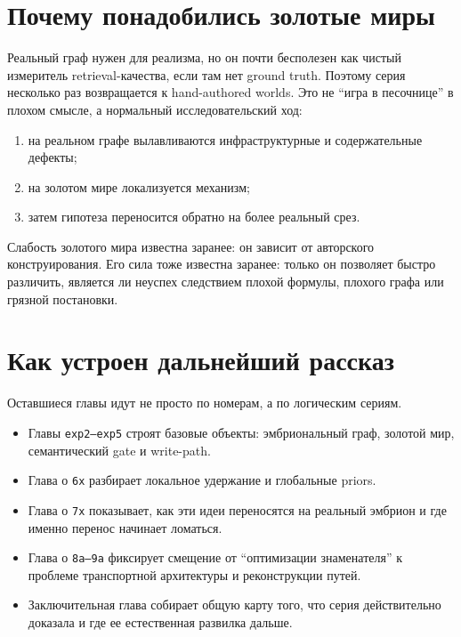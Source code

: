 \section{Почему понадобились золотые миры}

Реальный граф нужен для реализма, но он почти бесполезен как чистый измеритель
retrieval-качества, если там нет ground truth. Поэтому серия несколько раз
возвращается к hand-authored worlds. Это не ``игра в песочнице'' в плохом
смысле, а нормальный исследовательский ход:

\begin{enumerate}[leftmargin=2em]
\item на реальном графе вылавливаются инфраструктурные и содержательные дефекты;
\item на золотом мире локализуется механизм;
\item затем гипотеза переносится обратно на более реальный срез.
\end{enumerate}

Слабость золотого мира известна заранее: он зависит от авторского конструирования.
Его сила тоже известна заранее: только он позволяет быстро различить, является
ли неуспех следствием плохой формулы, плохого графа или грязной постановки.

\section{Как устроен дальнейший рассказ}

Оставшиеся главы идут не просто по номерам, а по логическим сериям.

\begin{itemize}[leftmargin=2em]
\item Главы \texttt{exp2--exp5} строят базовые объекты: эмбриональный граф,
золотой мир, семантический gate и write-path.
\item Глава о \texttt{6x} разбирает локальное удержание и глобальные priors.
\item Глава о \texttt{7x} показывает, как эти идеи переносятся на реальный
эмбрион и где именно перенос начинает ломаться.
\item Глава о \texttt{8a--9a} фиксирует смещение от ``оптимизации знаменателя'' к
проблеме транспортной архитектуры и реконструкции путей.
\item Заключительная глава собирает общую карту того, что серия действительно
доказала и где ее естественная развилка дальше.
\end{itemize}
